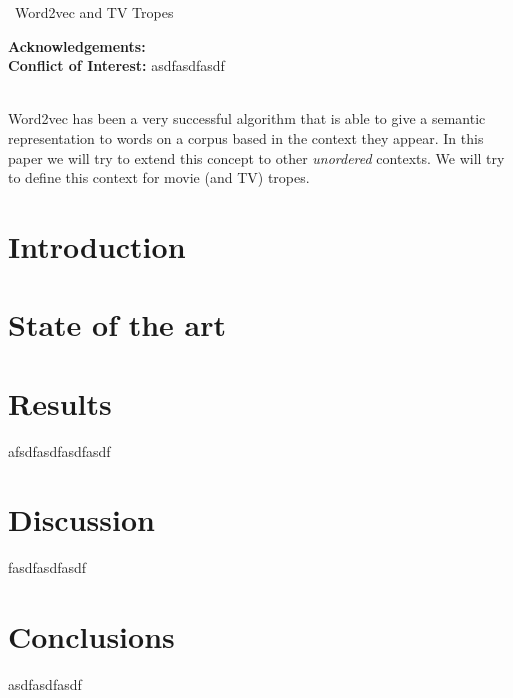 \documentclass[]{article}
\date{}
\makeatletter
\def\wileyIndent{1pt}
\renewenvironment{abstract}
{\vspace*{-1pc}\trivlist\item[]\leftskip\wileyIndent\hrulefill\par\vskip4pt\noindent\textbf{\abstractname}\mbox{\null}\\}{\par\noindent\hrulefill\endtrivlist}
\def\author#1{\gdef\@author{\hskip-\dimexpr(\tabcolsep)\hskip\wileyIndent\parbox{\dimexpr\textwidth-\wileyIndent}{\centering\bfseries#1}}}
\def\title#1{\gdef\@title{\centering\bfseries\ifx\@articleType\@empty\else\@articleType\\\fi#1}}
\let\@articleType\@empty \def\articletype#1{\gdef\@articleType{{\normalfont\itshape#1}}}
\def\thanksspace{{\phantom{\textsuperscript{\thefootnote}}}}
\makeatother
\begin{document}
\title{Anything2vec: generalizing word2vec via the use of meaningful contexts}
\author{JJ Merelo\thanks{E-mail:                     
                    jmerelo@ugr.es}{\thanksspace}}

\def\RunningHead{}\def\RunningAuthor{JJ Merelo}

\maketitle 


\def\RunningHead{{Word2vec and TV Tropes}}
\begin{center}
\par\vskip1pc~\RunningHead ~\\
\end{center}
\noindent\textbf{Acknowledgements: }~\\\noindent\textbf{Conflict of Interest: } asdfasdfasdf


\begin{abstract}
  Word2vec has been a very successful algorithm that is able to give a
  semantic representation to words on a corpus based in the context
  they appear. In this paper we will try to extend this concept to
  other {\em unordered} contexts. We will try to define this context
  for movie (and TV) tropes.
  
  \def\keywordstitle{Keywords}
\end{abstract}
    
\section{Introduction}





\section{State of the art}

\section{Results}
 afsdfasdfasdfasdf
    
\section{Discussion}
 fasdfasdfasdf
    
\section{Conclusions}
asdfasdfasdf
    





\end{document}
